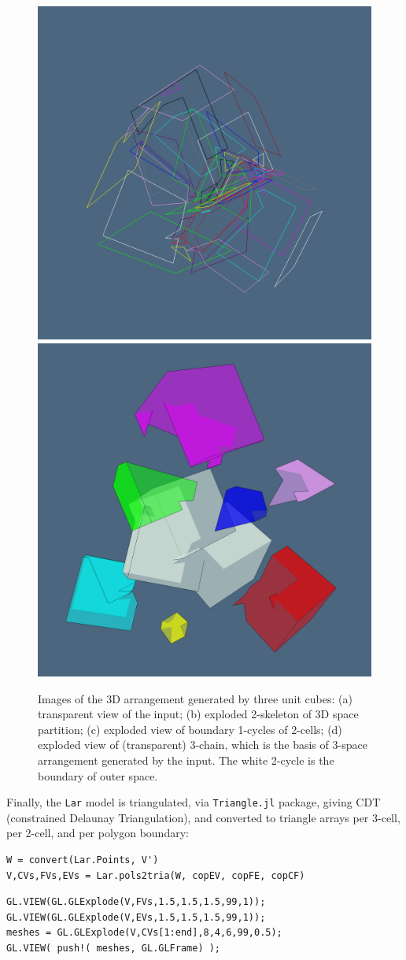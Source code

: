 \documentclass{juliacon}
\begin{document}
\begin{figure}[htbp]
   \includegraphics[width=0.5\linewidth]{figs/3cubes3.png}%
   \includegraphics[width=0.5\linewidth]{figs/3cubes4.png}%
  \caption{Images of the 3D arrangement generated by three unit cubes:
   (a) transparent view of the input; (b) exploded 2-skeleton of 3D space partition; 
   (c) exploded view of boundary 1-cycles of 2-cells; (d) exploded view of (transparent) 
   3-chain, which is the basis of 3-space arrangement generated by the input. The white 2-cycle is the 
   boundary of outer space.}
  \label{fig:threecubes}
 \end{figure}

Finally, the \texttt{Lar} model is triangulated, via \texttt{Triangle.jl} package, giving CDT (constrained Delaunay Triangulation), and converted to triangle arrays per 3-cell, per 2-cell, and per  polygon boundary:

{\footnotesize\begin{verbatim}
W = convert(Lar.Points, V')
V,CVs,FVs,EVs = Lar.pols2tria(W, copEV, copFE, copCF)
\end{verbatim}}



{\footnotesize\begin{verbatim}
GL.VIEW(GL.GLExplode(V,FVs,1.5,1.5,1.5,99,1));
GL.VIEW(GL.GLExplode(V,EVs,1.5,1.5,1.5,99,1));
meshes = GL.GLExplode(V,CVs[1:end],8,4,6,99,0.5);
GL.VIEW( push!( meshes, GL.GLFrame) );
\end{verbatim}}
\end{document}
